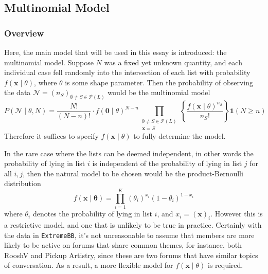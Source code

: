 \documentclass[10pt,a4paper,notitlepage]{article}
\newcommand{\x}{\textbf{x}}
\begin{document}
\subsection{Multinomial Model}\label{sc:3.2}
\subsubsection*{Overview}
Here, the main model that will be used in this essay is introduced: the multinomial model. Suppose $N$ was a fixed yet unknown quantity, and each individual case fell randomly into the intersection of each list with probability $f(\x\mid\theta)$, where $\theta$ is some shape parameter. Then the probability of observing the data $\mathcal{N}=(n_S)_{\emptyset\neq S\in\mathcal{P}(L)}$ would be the multinomial model
\begin{equation}\label{eq:Multinomial}
P\left(\mathcal{N}\mid\theta,N\right)=\frac{N!}{(N-n)!} \cdot f(\mathbf{0}\mid\theta)^{N-n}\prod_{\substack{\emptyset\neq S\in\mathcal{P}(L)\\ \x=S}}\left\lbrace \frac{f(\x\mid \theta)^{n_{S}}}{n_{S}!}\right\rbrace\mathbf{1}(N\geq n)
\end{equation}
Therefore it suffices to specify $f(\x\mid\theta)$ to fully determine the model. 

In the rare case where the lists can be deemed independent, in other words the probability of lying in list $i$ is independent of the probability of lying in list $j$ for all $i,j$, then the natural model to be chosen would be the product-Bernoulli distribution
\begin{equation}
f(\x\mid\bm{\theta})=\prod_{i=1}^{K}(\theta_{i})^{x_{i}}(1-\theta_{i})^{1-x_{i}}
\end{equation}
where $\theta_{i}$ denotes the probability of lying in list $i$, and $x_{i}=(\x)_{i}$. However this is a restrictive model, and one that is unlikely to be true in practice. Certainly with the data in \texttt{ExtremeBB}, it's not unreasonable to assume that members are more likely to be active on forums that share common themes, for instance, both RooshV and Pickup Artistry, since these are two forums that have similar topics of conversation.  As a result, a more flexible model for $f(\x\mid\theta)$ is required.
\end{document}
